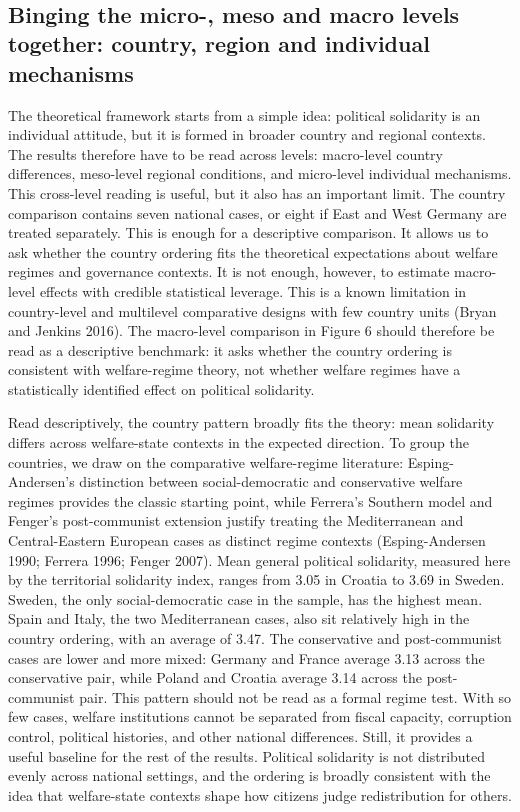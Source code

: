 \documentclass[12pt]{article}
\begin{document}
~

\subsection{\texorpdfstring{Binging the micro-, meso and macro levels
together: country, region and individual mechanisms
}{Binging the micro-, meso and macro levels together: country, region and individual mechanisms }}\label{binging-the-micro--meso-and-macro-levels-together-country-region-and-individual-mechanisms}

The theoretical framework starts from a simple idea: political
solidarity is an individual attitude, but it is formed in broader
country and regional contexts. The results therefore have to be read
across levels: macro-level country differences, meso-level regional
conditions, and micro-level individual mechanisms. This cross-level
reading is useful, but it also has an important limit. The country
comparison contains seven national cases, or eight if East and West
Germany are treated separately. This is enough for a descriptive
comparison. It allows us to ask whether the country ordering fits the
theoretical expectations about welfare regimes and governance contexts.
It is not enough, however, to estimate macro-level effects with credible
statistical leverage. This is a known limitation in country-level and
multilevel comparative designs with few country units (Bryan and Jenkins
2016). The macro-level comparison in Figure 6 should therefore be read
as a descriptive benchmark: it asks whether the country ordering is
consistent with welfare-regime theory, not whether welfare regimes have
a statistically identified effect on political solidarity.

Read descriptively, the country pattern broadly fits the theory: mean
solidarity differs across welfare-state contexts in the expected
direction. To group the countries, we draw on the comparative
welfare-regime literature: Esping-Andersen's distinction between
social-democratic and conservative welfare regimes provides the classic
starting point, while Ferrera's Southern model and Fenger's
post-communist extension justify treating the Mediterranean and
Central-Eastern European cases as distinct regime contexts
(Esping-Andersen 1990; Ferrera 1996; Fenger 2007). Mean general
political solidarity, measured here by the territorial solidarity index,
ranges from 3.05 in Croatia to 3.69 in Sweden. Sweden, the only
social-democratic case in the sample, has the highest mean. Spain and
Italy, the two Mediterranean cases, also sit relatively high in the
country ordering, with an average of 3.47. The conservative and
post-communist cases are lower and more mixed: Germany and France
average 3.13 across the conservative pair, while Poland and Croatia
average 3.14 across the post-communist pair. This pattern should not be
read as a formal regime test. With so few cases, welfare institutions
cannot be separated from fiscal capacity, corruption control, political
histories, and other national differences. Still, it provides a useful
baseline for the rest of the results. Political solidarity is not
distributed evenly across national settings, and the ordering is broadly
consistent with the idea that welfare-state contexts shape how citizens
judge redistribution for others.
\end{document}
